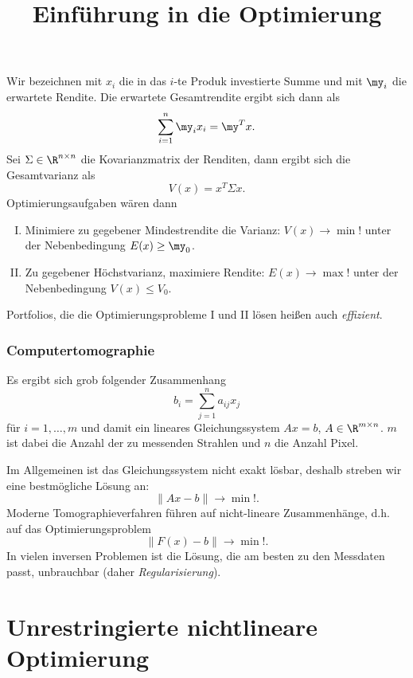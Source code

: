 \documentclass{mycourse}
\begin{document}
\title{Einführung in die Optimierung}

\maketitle

\tableofcontents




Wir bezeichnen mit $x_i$ die in das $i$-te Produk investierte Summe und mit $\my_i$ die erwartete Rendite.
Die erwartete Gesamtrendite ergibt sich dann als
\[
	\sum_{i=1}^n \my_i x_i = \my^T x.
\]
Sei $\Sigma \in \R^{n\times n}$ die Kovarianzmatrix der Renditen, dann ergibt sich die Gesamtvarianz als
\[
	V(x) = x^T \Sigma x.
\]
Optimierungsaufgaben wären dann
\begin{enumerate}[I.]
	\item
		Minimiere zu gegebener Mindestrendite die Varianz:
		$V(x) \to \min!$ unter der Nebenbedingung $E(x) \ge \my_0$.
	\item
		Zu gegebener Höchstvarianz, maximiere Rendite:
		$E(x) \to \max!$ unter der Nebenbedingung $V(x) \le V_0$.
\end{enumerate}
Portfolios, die die Optimierungsprobleme I und II lösen heißen auch \emph{effizient}.

\subsection{Computertomographie}

Es ergibt sich grob folgender Zusammenhang
\[
	b_i = \sum_{j=1}^n a_{ij} x_j
\]
für $i = 1, \dotsc, m$ und damit ein lineares Gleichungssystem $Ax = b$, $A \in \R^{m\times n}$.
$m$ ist dabei die Anzahl der zu messenden Strahlen und $n$ die Anzahl Pixel.

Im Allgemeinen ist das Gleichungssystem nicht exakt lösbar, deshalb streben wir eine bestmögliche Lösung an:
\[
	\|Ax - b\| \to \min!.
\]
Moderne Tomographieverfahren führen auf nicht-lineare Zusammenhänge, d.h. auf das Optimierungsproblem
\[
	\|F(x) - b\| \to \min!.
\]
In vielen inversen Problemen ist die Lösung, die am besten zu den Messdaten passt, unbrauchbar (daher \emph{Regularisierung}).



\chapter{Unrestringierte nichtlineare Optimierung}
\end{document}
